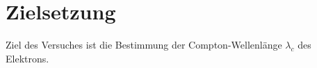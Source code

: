 \section{Zielsetzung}
\label{sec:Zielsetzung}
Ziel des Versuches ist die Bestimmung der Compton-Wellenlänge $\lambda_c$ des Elektrons.